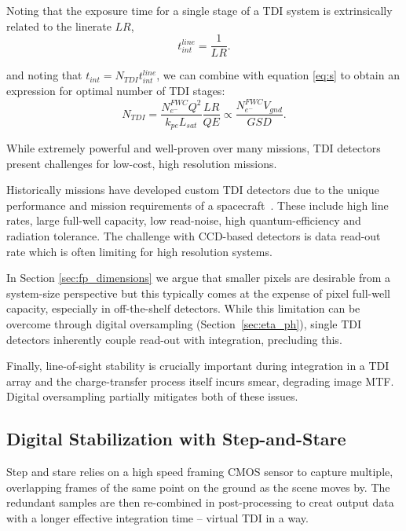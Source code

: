 \documentclass[]{spieman}  %
\newcommand{\includefigure}[3]
{
  \begin{figure}[h!tb]
  \centering
  \texttt{[image: \#1]}
  \caption[]{#3}
  \label{#2}
  \end{figure}
}
\begin{document}
Noting that the exposure time for a single stage of a TDI system is extrinsically related to the linerate $LR$,
\begin{equation}
t_{int}^{line} = \frac{1}{LR}
\label{eq:lr_tint}.
\end{equation}

and noting that $t_{int} = N_{TDI}t_{int}^{line}$, we can combine with equation \eqref{eq:s} to obtain an expression for optimal number of TDI stages:
\begin{equation}
N_{TDI} =\frac{N_{e^-}^{FWC} Q^2}{k_{pe} L_{sat}}\frac{LR}{QE} \propto \frac{N_{e^-}^{FWC}V_{gnd}}{GSD}
\label{eq:n_tdi}.
\end{equation}


While extremely powerful and well-proven over many missions, TDI detectors present challenges for low-cost, high resolution missions.

Historically missions have developed custom TDI detectors due to the unique performance and mission requirements of a spacecraft~\cite{jerram}.  These include high line rates, large full-well capacity, low read-noise, high quantum-efficiency and radiation tolerance.  The challenge with CCD-based detectors is data read-out rate which is often limiting for high resolution systems.

In Section \ref{sec:fp_dimensions} we argue that smaller pixels are desirable from a system-size perspective but this typically comes at the expense of pixel full-well capacity, especially in off-the-shelf detectors.  
While  this limitation can be overcome through digital oversampling (Section~\ref{sec:eta_ph}), single TDI detectors inherently couple read-out with integration, precluding this. 

Finally, line-of-sight stability is crucially important during integration in a TDI array \cite{pittelkau} and the charge-transfer process itself incurs smear\cite{fiete_blur}, degrading image MTF.  Digital oversampling partially mitigates both of these issues.

\subsection{Digital Stabilization with Step-and-Stare}
Step and stare relies on a high speed framing CMOS sensor to capture multiple, overlapping frames of the same point on the ground as the scene moves by.  The redundant samples are then re-combined in post-processing to creat output data with a longer effective integration time -- virtual TDI in a way.
\end{document}
